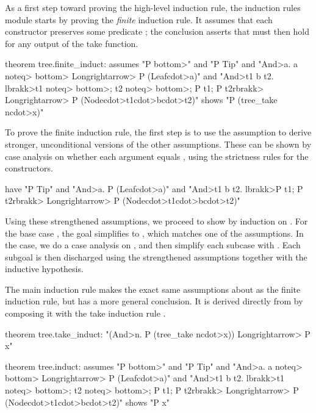 As a first step toward proving the high-level induction rule, the induction rules module starts by proving the \emph{finite} induction rule. It assumes that each constructor preserves some predicate ; the conclusion asserts that  must then hold for any output of the take function.
%
\begin{isacode}
theorem tree.finite_induct:
  assumes "P \<bottom>" and "P Tip" and "\<And>a. a \<noteq> \<bottom> \<Longrightarrow> P (Leaf\<cdot>a)"
    and "\<And>t1 b t2. \<lbrakk>t1 \<noteq> \<bottom>; t2 \<noteq> \<bottom>; P t1; P t2\<rbrakk> \<Longrightarrow> P (Node\<cdot>t1\<cdot>b\<cdot>t2)"
  shows "P (tree_take n\<cdot>x)"
\end{isacode}
%
To prove the finite induction rule, the first step is to use the assumption  to derive stronger, unconditional versions of the other assumptions. These can be shown by case analysis on whether each argument equals , using the strictness rules for the constructors.
%
\begin{isacode}
have "P Tip" and "\<And>a. P (Leaf\<cdot>a)"
  and "\<And>t1 b t2. \<lbrakk>P t1; P t2\<rbrakk> \<Longrightarrow> P (Node\<cdot>t1\<cdot>b\<cdot>t2)"
\end{isacode}
%
Using these strengthened assumptions, we proceed to show  by induction on . For the base case , the goal simplifies to , which matches one of the assumptions. In the  case, we do a case analysis on , and then simplify each subcase with . Each subgoal is then discharged using the strengthened assumptions together with the inductive hypothesis.

The main induction rule makes the exact same assumptions about  as the finite induction rule, but has a more general conclusion. It is derived directly from  by composing it with the take induction rule .

\begin{isacode}
theorem tree.take_induct: "(\<And>n. P (tree_take n\<cdot>x)) \<Longrightarrow> P x"
\end{isacode}
\unmedskip
{}
\begin{isacode}
theorem tree.induct:
  assumes "P \<bottom>" and "P Tip" and "\<And>a. a \<noteq> \<bottom> \<Longrightarrow> P (Leaf\<cdot>a)"
    and "\<And>t1 b t2. \<lbrakk>t1 \<noteq> \<bottom>; t2 \<noteq> \<bottom>; P t1; P t2\<rbrakk> \<Longrightarrow> P (Node\<cdot>t1\<cdot>b\<cdot>t2)"
  shows "P x"
\end{isacode}

